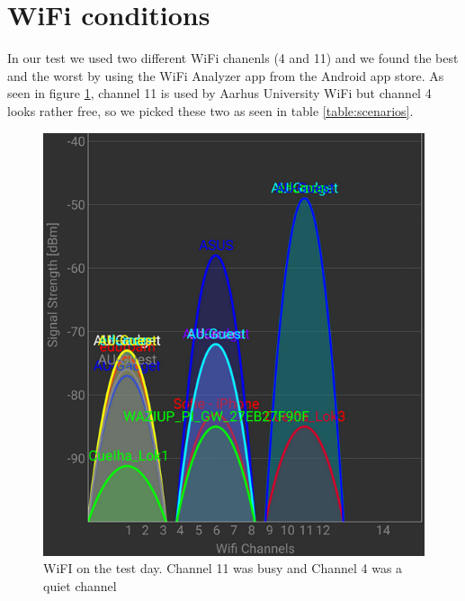\section{WiFi conditions}\label{sc:wifi}
In our test we used two different WiFi chanenls (4 and 11) and we found the best and the worst by using the WiFi Analyzer app from the Android app store\cite{Farproc@gmail.com2018}. As seen in figure \ref{fig:wifionthetestday}, channel 11 is used by Aarhus University WiFi but channel 4 looks rather free, so we picked these two as seen in table \ref{table:scenarios}.

\begin{figure}[H]
	\centering
	\includegraphics[width=0.6\linewidth]{testAndPerformance/wifi/wifiOnTheTestDay}
	\caption{WiFI on the test day. Channel 11 was busy and Channel 4 was a quiet channel}
	\label{fig:wifionthetestday}
\end{figure}
